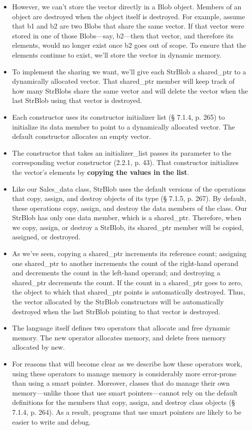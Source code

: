 \documentclass[twoside,english]{uiofysmaster}
\begin{document}
\begin{itemize}
\begin{itemize}
		\item However, we can’t store the vector directly in a Blob object. Members of an object are destroyed when the object itself is destroyed. For example, assume that b1 and b2 are two Blobs that share the same vector. If that vector were stored in one of those Blobs—say, b2—then that vector, and therefore its elements, would no longer exist once b2 goes out of scope. To ensure that the elements continue to exist, we’ll store the vector in dynamic memory.
		\item To implement the sharing we want, we’ll give each StrBlob a shared\_ptr to a dynamically allocated vector. That shared\_ptr member will keep track of how many StrBlobs share the same vector and will delete the vector when the last StrBlob using that vector is destroyed.
		\item Each constructor uses its constructor initializer list (§ 7.1.4, p. 265) to initialize its data member to point to a dynamically allocated vector. The default constructor allocates an empty vector.
		\item The constructor that takes an initializer\_list passes its parameter to the corresponding vector constructor (2.2.1, p. 43). That constructor initializes the vector’s elements by \textbf{copying the values in the list}.
		\item Like our Sales\_data class, StrBlob uses the default versions of the operations that copy, assign, and destroy objects of its type (§ 7.1.5, p. 267). By default, these operations copy, assign, and destroy the data members of the class. Our StrBlob has only one data member, which is a shared\_ptr. Therefore, when we copy, assign, or destroy a StrBlob, its shared\_ptr member will be copied, assigned, or destroyed.
		\item As we’ve seen, copying a shared\_ptr increments its reference count; assigning one shared\_ptr to another increments the count of the right-hand operand and decrements the count in the left-hand operand; and destroying a shared\_ptr decrements the count. If the count in a shared\_ptr goes to zero, the object to which that shared\_ptr points is automatically destroyed. Thus, the vector allocated by the StrBlob constructors will be automatically destroyed when the last StrBlob pointing to that vector is destroyed.
		\item The language itself defines two operators that allocate and free dynamic memory. The new operator allocates memory, and delete frees memory allocated by new.
		\item For reasons that will become clear as we describe how these operators work, using these operators to manage memory is considerably more error-prone than using a smart pointer. Moreover, classes that do manage their own memory—unlike those that use smart pointers—cannot rely on the default definitions for the members that copy, assign, and destroy class objects (§ 7.1.4, p. 264). As a result, programs that use smart pointers are likely to be easier to write and debug.

\end{itemize}
\end{itemize}
\end{document}

